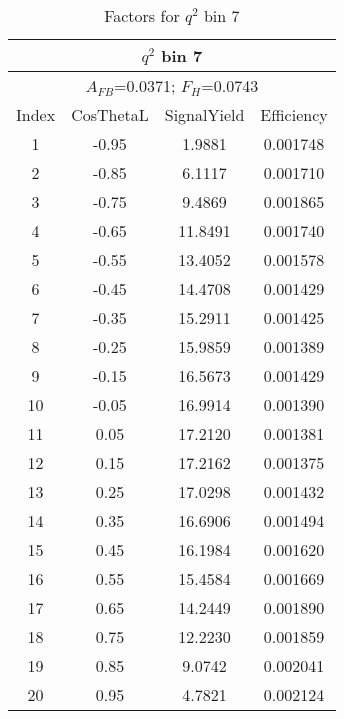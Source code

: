 \begin{table*}[htbH]
  \begin{center}
  \caption{Factors for $q^2$ bin 7 
  \label{tab:factors_bin7}}
  \small
  \begin{tabular}{|c||c|c|c|}
    \hline
    \multicolumn{4}{|c|}{$q^2$ bin 7} \\ 
    \hline
    \multicolumn{4}{|c|}{$A_{FB}$=0.0371;   $F_{H}$=0.0743} \\ 
    \hline
    Index & CosThetaL & SignalYield & Efficiency \\ 
    \hline
    1 & -0.95 & 1.9881 & 0.001748 \\ 
    2 & -0.85 & 6.1117 & 0.001710 \\ 
    3 & -0.75 & 9.4869 & 0.001865 \\ 
    4 & -0.65 & 11.8491 & 0.001740 \\ 
    5 & -0.55 & 13.4052 & 0.001578 \\ 
    6 & -0.45 & 14.4708 & 0.001429 \\ 
    7 & -0.35 & 15.2911 & 0.001425 \\ 
    8 & -0.25 & 15.9859 & 0.001389 \\ 
    9 & -0.15 & 16.5673 & 0.001429 \\ 
    10 & -0.05 & 16.9914 & 0.001390 \\ 
    11 & 0.05 & 17.2120 & 0.001381 \\ 
    12 & 0.15 & 17.2162 & 0.001375 \\ 
    13 & 0.25 & 17.0298 & 0.001432 \\ 
    14 & 0.35 & 16.6906 & 0.001494 \\ 
    15 & 0.45 & 16.1984 & 0.001620 \\ 
    16 & 0.55 & 15.4584 & 0.001669 \\ 
    17 & 0.65 & 14.2449 & 0.001890 \\ 
    18 & 0.75 & 12.2230 & 0.001859 \\ 
    19 & 0.85 & 9.0742 & 0.002041 \\ 
    20 & 0.95 & 4.7821 & 0.002124 \\ 
    \hline
  \end{tabular}
  \end{center}
\end{table*}


